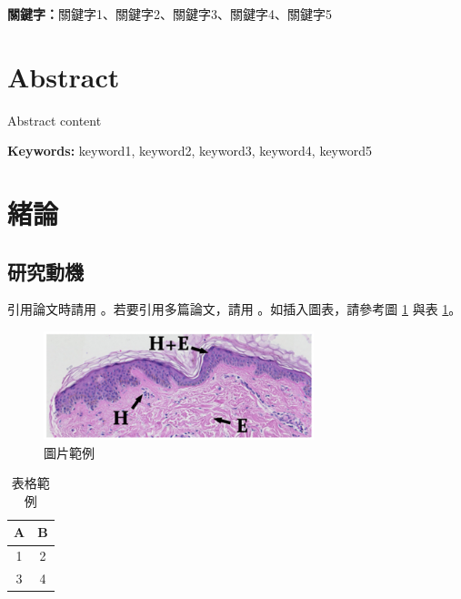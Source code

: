 \documentclass{ccuthesis}
\begin{document}
\medskip\textbf{關鍵字：}關鍵字1、關鍵字2、關鍵字3、關鍵字4、關鍵字5



\clearpage
{}
\section*{Abstract}
Abstract content


\medskip\textbf{Keywords:} keyword1, keyword2, keyword3, keyword4, keyword5



\clearpage
{}
\tableofcontents  %
\clearpage
{}
\listoffigures  %
\clearpage
{}
\listoftables   %
\clearpage


\section{緒論}
\subsection{研究動機}
引用論文時請用 \cite{Rowe:2005:ASR}。若要引用多篇論文，請用 \cite{Rowe:2005:ASR,vinet1989universal}。如插入圖表，請參考圖 \ref{fig:example} 與表 \ref{tab:example}。

\begin{figure}[htbp]
\centering
\includegraphics[width=0.7\textwidth]{figures/example.png}
\caption{圖片範例}
\label{fig:example}
\end{figure}

\begin{table}[htbp]
\centering
\caption{表格範例}
\label{tab:example}
\begin{tabular}{cc}
	\toprule
	\textbf{A} & \textbf{B} \\
	\midrule
	1 & 2 \\
	3 & 4 \\
	\bottomrule
\end{tabular}
\end{table}
\end{document}
